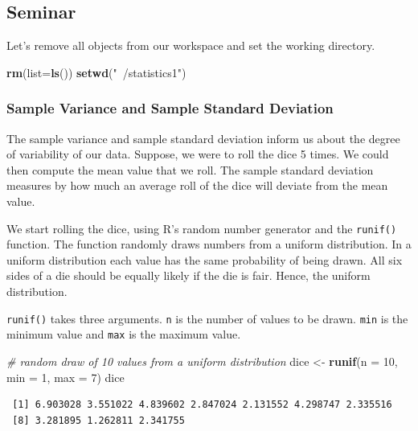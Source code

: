 \documentclass[]{article}
\newenvironment{Shaded}{\begin{snugshade}}{\end{snugshade}}
\newcommand{\KeywordTok}[1]{\textcolor[rgb]{0.13,0.29,0.53}{\textbf{#1}}}
\newcommand{\DataTypeTok}[1]{\textcolor[rgb]{0.13,0.29,0.53}{#1}}
\newcommand{\DecValTok}[1]{\textcolor[rgb]{0.00,0.00,0.81}{#1}}
\newcommand{\StringTok}[1]{\textcolor[rgb]{0.31,0.60,0.02}{#1}}
\newcommand{\CommentTok}[1]{\textcolor[rgb]{0.56,0.35,0.01}{\textit{#1}}}
\newcommand{\NormalTok}[1]{#1}
\theoremstyle{definition}
\theoremstyle{definition}
\theoremstyle{definition}
\theoremstyle{remark}
\begin{document}
\subsection{Seminar}\label{seminar-4}

Let's remove all objects from our workspace and set the working
directory.

\begin{Shaded}
\begin{Highlighting}[]
\KeywordTok{rm}\NormalTok{(}\DataTypeTok{list=}\KeywordTok{ls}\NormalTok{())}
\KeywordTok{setwd}\NormalTok{(}\StringTok{"~/statistics1"}\NormalTok{)}
\end{Highlighting}
\end{Shaded}

\subsubsection{Sample Variance and Sample Standard
Deviation}\label{sample-variance-and-sample-standard-deviation}

The sample variance and sample standard deviation inform us about the
degree of variability of our data. Suppose, we were to roll the dice 5
times. We could then compute the mean value that we roll. The sample
standard deviation measures by how much an average roll of the dice will
deviate from the mean value.

We start rolling the dice, using R's random number generator and the
\texttt{runif()} function. The function randomly draws numbers from a
uniform distribution. In a uniform distribution each value has the same
probability of being drawn. All six sides of a die should be equally
likely if the die is fair. Hence, the uniform distribution.

\texttt{runif()} takes three arguments. \texttt{n} is the number of
values to be drawn. \texttt{min} is the minimum value and \texttt{max}
is the maximum value.

\begin{Shaded}
\begin{Highlighting}[]
\CommentTok{# random draw of 10 values from a uniform distribution}
\NormalTok{dice <-}\StringTok{ }\KeywordTok{runif}\NormalTok{(}\DataTypeTok{n =} \DecValTok{10}\NormalTok{, }\DataTypeTok{min =} \DecValTok{1}\NormalTok{, }\DataTypeTok{max =} \DecValTok{7}\NormalTok{)}
\NormalTok{dice}
\end{Highlighting}
\end{Shaded}

\begin{verbatim}
 [1] 6.903028 3.551022 4.839602 2.847024 2.131552 4.298747 2.335516
 [8] 3.281895 1.262811 2.341755
\end{verbatim}
\end{document}
